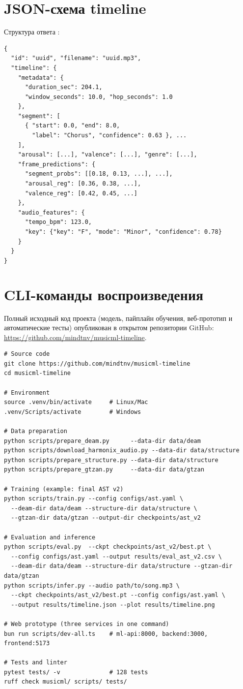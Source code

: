 \chapter{JSON-схема timeline}\label{app:D}

Структура ответа :

\begin{lstlisting}
{
  "id": "uuid", "filename": "uuid.mp3",
  "timeline": {
    "metadata": {
      "duration_sec": 204.1,
      "window_seconds": 10.0, "hop_seconds": 1.0
    },
    "segment": [
      { "start": 0.0, "end": 8.0,
        "label": "Chorus", "confidence": 0.63 }, ...
    ],
    "arousal": [...], "valence": [...], "genre": [...],
    "frame_predictions": {
      "segment_probs": [[0.18, 0.13, ...], ...],
      "arousal_reg": [0.36, 0.38, ...],
      "valence_reg": [0.42, 0.45, ...]
    },
    "audio_features": {
      "tempo_bpm": 123.0,
      "key": {"key": "F", "mode": "Minor", "confidence": 0.78}
    }
  }
}
\end{lstlisting}

\chapter{CLI-команды воспроизведения}\label{app:E}

Полный исходный код проекта (модель, пайплайн обучения, веб-прототип и автоматические тесты) опубликован в открытом репозитории GitHub: \url{https://github.com/mindtnv/musicml-timeline}.

\begin{lstlisting}
# Source code
git clone https://github.com/mindtnv/musicml-timeline
cd musicml-timeline

# Environment
source .venv/bin/activate     # Linux/Mac
.venv/Scripts/activate        # Windows

# Data preparation
python scripts/prepare_deam.py      --data-dir data/deam
python scripts/download_harmonix_audio.py --data-dir data/structure
python scripts/prepare_structure.py --data-dir data/structure
python scripts/prepare_gtzan.py     --data-dir data/gtzan

# Training (example: final AST v2)
python scripts/train.py --config configs/ast.yaml \
  --deam-dir data/deam --structure-dir data/structure \
  --gtzan-dir data/gtzan --output-dir checkpoints/ast_v2

# Evaluation and inference
python scripts/eval.py  --ckpt checkpoints/ast_v2/best.pt \
  --config configs/ast.yaml --output results/eval_ast_v2.csv \
  --deam-dir data/deam --structure-dir data/structure --gtzan-dir data/gtzan
python scripts/infer.py --audio path/to/song.mp3 \
  --ckpt checkpoints/ast_v2/best.pt --config configs/ast.yaml \
  --output results/timeline.json --plot results/timeline.png

# Web prototype (three services in one command)
bun run scripts/dev-all.ts    # ml-api:8000, backend:3000, frontend:5173

# Tests and linter
pytest tests/ -v              # 128 tests
ruff check musicml/ scripts/ tests/
\end{lstlisting}
